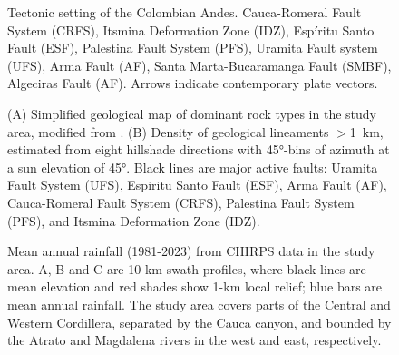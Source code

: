 \documentclass[draft]{agujournal2019}
\begin{document}
\newpage

\begin{figure}[ht!]
    \caption{Tectonic setting of the Colombian Andes. Cauca-Romeral Fault System (CRFS), Itsmina Deformation Zone (IDZ), Espíritu Santo Fault (ESF), Palestina Fault System (PFS), Uramita Fault system (UFS), Arma Fault (AF), Santa Marta-Bucaramanga Fault (SMBF), Algeciras Fault (AF). Arrows indicate contemporary plate vectors.}
    \label{fig:marco}
\end{figure}


\begin{figure}[ht!]
  \begin{minipage}{.48\linewidth}
    \centering
  \end{minipage}\quad
  \begin{minipage}{.48\linewidth}
    \centering
  \end{minipage}
    \caption{(A) Simplified geological map of dominant rock types in the study area, modified from . (B) Density of geological lineaments $>$1~km, estimated from eight hillshade directions with 45°-bins of azimuth at a sun elevation of 45°. Black lines are major active faults: Uramita Fault System (UFS), Espiritu Santo Fault (ESF), Arma Fault (AF), Cauca-Romeral Fault System (CRFS), Palestina Fault System (PFS), and Itsmina Deformation Zone (IDZ).}
    \label{fig:geologia}
\end{figure}


\begin{figure}[ht!]  
  \begin{minipage}{.45\linewidth}
    \centering
  \end{minipage}\quad
  \begin{minipage}{.51\linewidth}
    \centering
  \end{minipage}
    \caption{Mean annual rainfall (1981-2023) from CHIRPS data \cite{funk2015} in the study area. A, B and C are 10-km swath profiles, where black lines are mean elevation and red shades show 1-km local relief; blue bars are mean annual rainfall. The study area covers parts of the Central and Western Cordillera, separated by the Cauca canyon, and bounded by the Atrato and Magdalena rivers in the west and east, respectively.}
    \label{fig:rainfall}
\end{figure}
\end{document}
